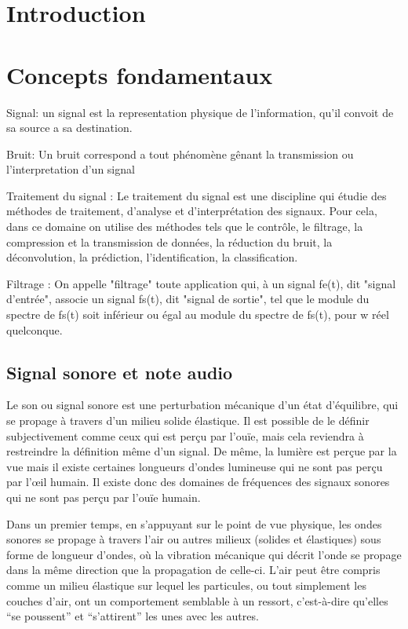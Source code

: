 \documentclass[conference,onecolumn]{IEEEtran}
\begin{document}
\section{Introduction}

\section{Concepts fondamentaux}

Signal: un signal est la representation physique de l'information, qu'il convoit de sa source a sa destination.


Bruit: Un bruit correspond a tout phénomène gênant la transmission ou l'interpretation d'un signal

Traitement du signal : Le traitement du signal est une discipline qui étudie des méthodes de traitement, d’analyse et d’interprétation des signaux. Pour cela, dans ce domaine on utilise des méthodes tels que le contrôle, le filtrage, la compression et la transmission de données, la réduction du bruit, la déconvolution, la prédiction, l'identification, la classification.  


Filtrage : On appelle "filtrage" toute application qui, à un signal fe(t), dit "signal d'entrée", associe un signal fs(t), dit "signal de sortie", tel que le module du spectre de fs(t) soit inférieur ou égal au module du spectre de fs(t), pour w réel quelconque. 

\subsection{Signal sonore et note audio}
Le son ou signal sonore est une perturbation mécanique d’un état d’équilibre, qui se propage à travers d’un milieu solide élastique. Il est possible de le définir subjectivement comme ceux qui est perçu par l’ouïe, mais cela reviendra à restreindre la définition même d’un signal. De même, la lumière est perçue par la vue mais il existe certaines longueurs d’ondes lumineuse qui ne sont pas perçu par l’œil humain. Il existe donc des domaines de fréquences des signaux sonores qui ne sont pas perçu par l’ouïe humain. 

Dans un premier temps, en s’appuyant sur le point de vue physique, les ondes sonores se propage à travers l’air ou autres milieux (solides et élastiques) sous forme de longueur d’ondes, où la vibration mécanique qui décrit l’onde se propage dans la même direction que la propagation de celle-ci. L’air peut être compris comme un milieu élastique sur lequel les particules, ou tout simplement les couches d’air, ont un comportement semblable à un ressort, c’est-à-dire qu’elles “se poussent” et “s’attirent” les unes avec les autres. 
\end{document}
